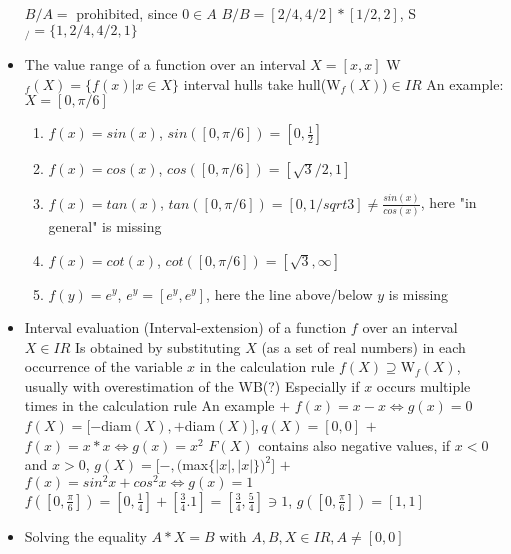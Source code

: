 \documentclass[a4paper, 11pt]{report}
\theoremstyle{break}
\theoremstyle{proofstyle}
\begin{document}
\begin{itemize}
    \newline $B/A=$ prohibited, since $0\in A$
    \newline $B/B=[2/4,4/2]*[1/2,2]$, S$_/=\{1,2/4,4/2,1\}$
    \item The value range of a function over an interval $X=[x,x]$
    \newlie W$_f(X)=\{f(x)|x\in X\}$ \to interval hulls take hull(W$_f(X)$)$\in IR$
    \newline An example: $X=[0,\pi/6]$
    \begin{enumerate}
        \item $f(x)=sin(x)$, $sin([0,\pi/6])=[0,\frac{1}{2}]$
        \item $f(x)=cos(x)$, $cos([0,\pi/6])=[\sqrt{3}/2,1]$
        \item $f(x)=tan(x)$, $tan([0,\pi/6])=[0,1/sqrt{3}] \not = \frac{sin(x)}{cos(x)}$, here "in general" is missing 
        \item $f(x)=cot(x)$, $cot([0,\pi/6])=[\sqrt{3}, \infty]$
        \item $f(y)=e^y$, $e^y=[e^y, e^y]$, here the line above/below $y$ is missing
    \end{enumerate}
    \item Interval evaluation (Interval-extension) of a function $f$ over an interval $X\in IR$
    \newline Is obtained by substituting $X$ (as a set of real numbers) in each occurrence of the variable $x$ in the calculation rule
    \newline $f(X)\supseteq $W$_f(X)$, usually with overestimation of the WB(?)
    \newline Especially if $x$ occurs multiple times in the calculation rule
    \newline An example 
    \newline $+$ $f(x)=x-x \iff g(x)=0$
    \newline $f(X)=[-$diam$(X),+$diam$(X)], q(X)=[0,0]$
    \newline $+$ $f(x)=x*x \iff g(x)=x^2$
    \newline $F(X)$ contains also negative values, if $x<0$ and $x>0$, 
    \newline $g(X)=[-,($max$\{|x|,|x|\})^2]$
    \newline $+$ $f(x)=sin^2x+cos^2x \iff g(x)=1$
    \newline $f([0,\frac{\pi}{6}])=[0,\frac{1}{4}]+[\frac{3}{4}.1]=[\frac{3}{4},\frac{5}{4}]\ni 1$, $g([0,\frac{\pi}{6}])=[1,1]$
    \item Solving the equality $A*X=B$ with $A,B,X\in IR, A\not =[0,0]$

\end{itemize}
\end{document}
